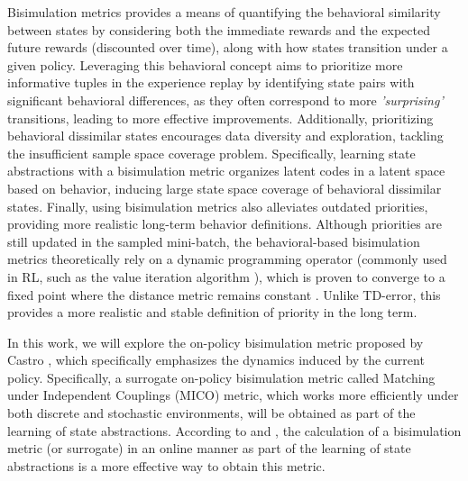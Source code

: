 Bisimulation metrics \cite{ferns2004metrics, ferns2011bisimulation, ferns2014bisimulation, castro2020scalable} provides a means of quantifying the behavioral similarity between states by considering both the immediate rewards and the expected future rewards (discounted over time), along with how states transition under a given policy. Leveraging this behavioral concept aims to prioritize more informative tuples in the experience replay by identifying state pairs with significant behavioral differences, as they often correspond to more \textit{'surprising'} transitions, leading to more effective improvements. Additionally, prioritizing behavioral dissimilar states encourages data diversity and exploration, tackling the insufficient sample space coverage problem. Specifically, learning state abstractions with a bisimulation metric organizes latent codes in a latent space based on behavior, inducing large state space coverage of behavioral dissimilar states. Finally, using bisimulation metrics also alleviates outdated priorities, providing more realistic long-term behavior definitions. Although priorities are still updated in the sampled mini-batch, the behavioral-based bisimulation metrics theoretically rely on a dynamic programming operator (commonly used in RL, such as the value iteration algorithm \cite{sutton2018reinforcement}), which is proven to converge to a fixed point where the distance metric remains constant \cite{castro2020scalable, castro2021mico}. Unlike TD-error, this provides a more realistic and stable definition of priority in the long term.

In this work, we will explore the on-policy bisimulation metric proposed by Castro \cite{castro2020scalable}, which specifically emphasizes the dynamics induced by the current policy. Specifically, a surrogate on-policy bisimulation metric called Matching under Independent Couplings (MICO) \cite{castro2021mico} metric, which works more efficiently under both discrete and stochastic environments, will be obtained as part of the learning of state abstractions. According to \cite{zhang2020learning} and \cite{castro2021mico}, the calculation of a bisimulation metric (or surrogate) in an online manner as part of the learning of state abstractions is a more effective way to obtain this metric.



